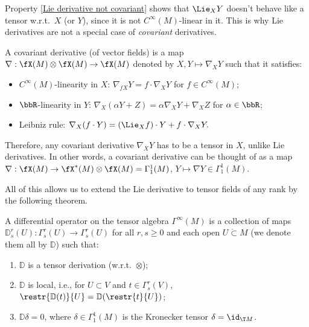 \begin{rem}\label{rem: Lie derivatives not covariant}
    Property \eqref{Lie derivative not covariant} shows that $\Lie_X Y$ doesn't behave like a tensor w.r.t.\ $X$ (or $Y$), since it is not $C^\infty(M)$-linear in it. This is why Lie derivatives are not a special case of \emph{covariant} derivatives.
    
    A covariant derivative (of vector fields) is a map $\nabla:\fX(M)\otimes\fX(M)\to \fX(M)$ denoted by $X,Y\mapsto \nabla_X Y$ such that it satisfies:
    \begin{itemize}
        \item $C^\infty(M)$-linearity in $X$: $\nabla_{fX}Y=f\cdot \nabla_X Y$ for $f\in C^\infty(M)$;
        \item $\bbR $-linearity in $Y$: $\nabla_X (\alpha Y+Z)=\alpha \nabla_XY+\nabla_XZ$ for $\alpha\in\bbR $;
        \item Leibniz rule: $\nabla_X(f\cdot Y)=(\Lie_X f)\cdot Y+f\cdot \nabla_X Y.$
    \end{itemize}
    Therefore, any covariant derivative $\nabla_X Y$ has to be a tensor in $X$, unlike Lie derivatives. In other words, a covariant derivative can be thought of as a map $\nabla:\fX(M)\to \fX^\ast(M)\otimes\fX(M)=\Gamma^1_1(M)$, $Y\mapsto \nabla Y\in\Gamma^1_1(M)$.
\end{rem}

All of this allows us to extend the Lie derivative to tensor fields of any rank by the following theorem.

\begin{defn}
    A differential operator on the tensor algebra $\Gamma^\infty(M)$ is a collection of maps $\mathbb{D}^r_s(U):\Gamma^r_s(U)\to \Gamma^r_s(U)$ for all $r,s\geq 0$ and each open $U\mathring{\subset}M$ (we denote them all by $\mathbb{D}$) such that:
\begin{enumerate}
    \item $\mathbb{D}$ is a tensor derivation (w.r.t.\ $\otimes$);
    \item $\mathbb{D}$ is local, i.e., for $U\subset V$ and $t\in\Gamma^r_s(V)$, $\restr{\mathbb{D}(t)}{U}=\mathbb{D}(\restr{t}{U})$;
    \item $\mathbb{D} \delta=0$, where $\delta\in\Gamma^1_1(M)$ is the Kronecker tensor $\delta=\id_{\T M}$.
\end{enumerate}
\end{defn}

